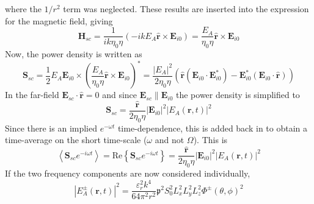 \documentclass[11pt,twoside]{eitExjobb}
\begin{document}
	where the $1/r^2$ term was neglected. These results are inserted into the expression for the magnetic field, giving
	\begin{equation*}
		\bm{H}_{sc} = \frac{1}{ik \eta_0 \eta} (-ikE_A \bm{\hat{r}} \times \bm{E}_{i0}) = \frac{E_A}{ \eta_0 \eta} \bm{\hat{r}} \times \bm{E}_{i0}
	\end{equation*}
	Now, the power density is written as
	\begin{equation*}
		\bm{S}_{sc} = \frac{1}{2} E_A \bm{E}_{i0} \times \left( \frac{E_A}{ \eta_0 \eta} \bm{\hat{r}} \times \bm{E}_{i0} \right)^* = \frac{|E_A|^2}{2\eta_0 \eta} \left( \bm{\hat{r}} (\bm{E}_{i0} \cdot \bm{E}_{i0}^*) - \bm{E}_{i0}^* (\bm{E}_{i0} \cdot \bm{\hat{r}}) \right)
	\end{equation*}
	In the far-field $\bm{E}_{sc} \cdot \bm{\hat{r}} = 0$ and since $\bm{E}_{sc} \parallel \bm{E}_{i0}$ the power density is simplified to
	\begin{equation*}
		\bm{S}_{sc} = \frac{\bm{\hat{r}}}{2\eta_0 \eta} |\bm{E}_{i0}|^2 |E_A (\bm{r},t)|^2
	\end{equation*}
	Since there is an implied $e^{-\omega t}$ time-dependence, this is added back in to obtain a time-average on the short time-scale ($\omega$ and not $\Omega$). This is
	\begin{equation*}
		\left< \bm{S}_{sc} e^{-i\omega t} \right> = \mathrm{Re}\left\{ \bm{S}_{sc} e^{-i\omega t} \right\} = \frac{\bm{\hat{r}}}{2\eta_0 \eta} |\bm{E}_{i0}|^2 |E_A (\bm{r},t)|^2
	\end{equation*}
	If the two frequency components are now considered individually,
	\begin{equation*}
		|E_A^\pm (\bm{r},t)|^2 =\frac{\varepsilon_r^2 k^4}{64 \pi^2 r^2} \mathfrak{p}^2 S_0^2 L_x^2 L_y^2 L_z^2 \Phi^\pm (\theta,\phi)^2
	\end{equation*}
	
\end{document}
